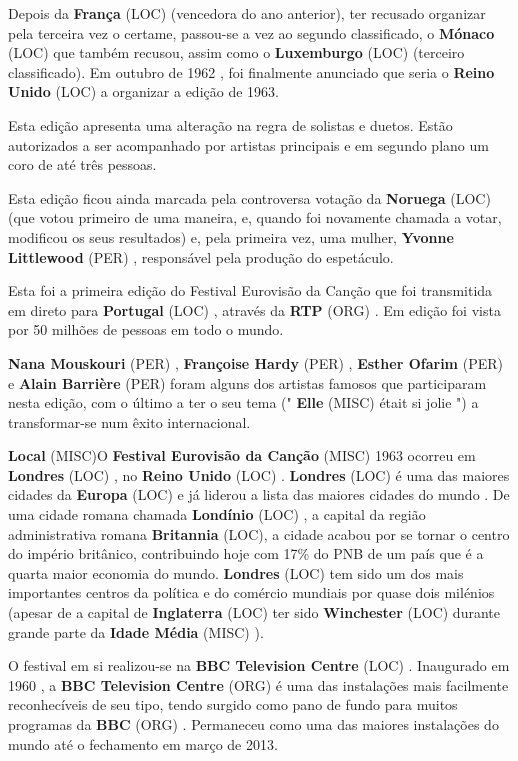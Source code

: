\documentclass[12pt,a4paper]{article}
\begin{document}
Depois da \textbf{França} (LOC) (vencedora do ano anterior), ter recusado organizar pela terceira vez o certame, passou-se a vez ao segundo classificado, o \textbf{Mónaco} (LOC) que também recusou, assim como o \textbf{Luxemburgo} (LOC) (terceiro classificado). Em outubro de 1962 , foi finalmente anunciado que seria o \textbf{Reino Unido} (LOC) a organizar a edição de 1963.

Esta edição apresenta uma alteração na regra de solistas e duetos. Estão autorizados a ser acompanhado por artistas principais e em segundo plano um coro de até três pessoas.

Esta edição ficou ainda marcada pela controversa votação da \textbf{Noruega} (LOC) (que votou primeiro de uma maneira, e, quando foi novamente chamada a votar, modificou os seus resultados) e, pela primeira vez, uma mulher, \textbf{Yvonne Littlewood} (PER) , responsável pela produção do espetáculo.

Esta foi a primeira edição do Festival Eurovisão da Canção que foi transmitida em direto para \textbf{Portugal} (LOC) , através da \textbf{RTP} (ORG) . Em edição foi vista por 50 milhões de pessoas em todo o mundo.

\textbf{Nana Mouskouri} (PER) , \textbf{Françoise Hardy} (PER) , \textbf{Esther Ofarim} (PER) e \textbf{Alain Barrière} (PER) foram alguns dos artistas famosos que participaram nesta edição, com o último a ter o seu tema (" \textbf{Elle} (MISC) était si jolie ") a transformar-se num êxito internacional.



\textbf{Local} (MISC)O \textbf{Festival Eurovisão da Canção} (MISC) 1963 ocorreu em \textbf{Londres} (LOC) , no \textbf{Reino Unido} (LOC) . \textbf{Londres} (LOC) é uma das maiores cidades da \textbf{Europa} (LOC) e já liderou a lista das maiores cidades do mundo . De uma cidade romana chamada \textbf{Londínio} (LOC) , a capital da região administrativa romana \textbf{Britannia} (LOC), a cidade acabou por se tornar o centro do império britânico, contribuindo hoje com 17\% do PNB de um país que é a quarta maior economia do mundo. \textbf{Londres} (LOC) tem sido um dos mais importantes centros da política e do comércio mundiais por quase dois milénios (apesar de a capital de \textbf{Inglaterra} (LOC) ter sido \textbf{Winchester} (LOC) durante grande parte da \textbf{Idade Média} (MISC) ).

O festival em si realizou-se na \textbf{BBC Television Centre} (LOC) . Inaugurado em 1960 , a \textbf{BBC Television Centre} (ORG) é uma das instalações mais facilmente reconhecíveis de seu tipo, tendo surgido como pano de fundo para muitos programas da \textbf{BBC} (ORG) . Permaneceu como uma das maiores instalações do mundo até o fechamento em março de 2013.
\end{document}
